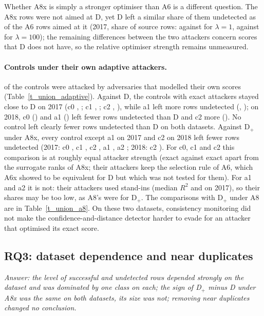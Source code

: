 Whether A8x is simply a stronger optimiser than A6 is a different question.
The A8x rows were not aimed at D, yet D left a similar share of them undetected as of the A6 rows aimed at it (2017,
share of source rows: \evadeDAxOneSeventeen{} against \evadeDAsixOneSeventeen{} for $\lambda = 1$,
\evadeDAxHundredSeventeen{} against \evadeDAsixHundredSeventeen{} for $\lambda = 100$); the remaining differences between
the two attackers concern scores that D does not have, so the relative optimiser strength remains unmeasured.

\paragraph{Controls under their own adaptive attackers.}
\nControlsAttacked{} of the \nControlsAll{} controls were attacked by adversaries that modelled their own scores
(Table~\ref{t_union_adaptive}).
Against D, the controls with exact attackers stayed close to D on 2017 (c0 \cmdCzeroVoneSeventeen{},
\cmdCzeroVoneSeventeenCI; c1 \cmdConeVoneSeventeen{}, \cmdConeVoneSeventeenCI; c2 \cmdCtwoVoneSeventeen{},
\cmdCtwoVoneSeventeenCI), while a1 left more rows undetected (\cmdAoneVoneSeventeen{}, \cmdAoneVoneSeventeenCI); on
2018, c0 (\cmdCzeroVoneEighteen) and a1 (\cmdAoneVoneEighteen) left fewer rows undetected than D and c2 more
(\cmdCtwoVoneEighteen).
No control left clearly fewer rows undetected than D on both datasets.
Against D$_+$ under A8x, every control except a1 on 2017 and c2 on 2018 left fewer rows undetected (2017: c0
\cmxCzeroVoneSeventeen, c1 \cmxConeVoneSeventeen, c2 \cmxCtwoVoneSeventeen, a1 \cmxAoneVoneSeventeen{}
\cmxAoneVoneSeventeenCI, a2 \cmxAtwoVoneSeventeen; 2018: c2 \cmxCtwoVoneEighteen{} \cmxCtwoVoneEighteenCI).
For c0, c1 and c2 this comparison is at roughly equal attacker strength (exact against exact apart from the surrogate
ranks of A8x; their attackers keep the selection rule of A6, which A6x showed to be equivalent for D but which was not
tested for them).
For a1 and a2 it is not: their attackers used stand-ins (median $R^2$ \rtwoMedAoneSeventeen{} and
\rtwoMedAtwoSeventeen{} on 2017), so their shares may be too low, as A8's were for D$_+$.
The comparisons with D$_+$ under A8 are in Table~\ref{t_union_a8}.
On these two datasets, consistency monitoring did not make the confidence-and-distance detector harder to evade for an
attacker that optimised its exact score.

\subsection{RQ3: dataset dependence and near duplicates}
\label{sec:rq3}
\emph{Answer: the level of successful and undetected rows depended strongly on the dataset and was dominated by one
class on each; the sign of D$_+$ minus D under A8x was the same on both datasets, its size was not; removing near
duplicates changed no conclusion.}

